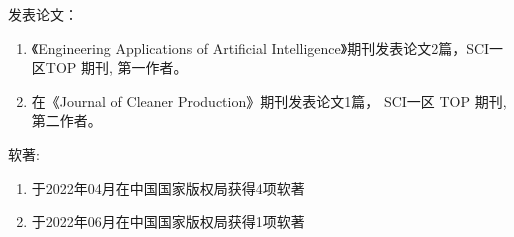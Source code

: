 \noindent 发表论文：

\begin{enumerate}[shuzi]
    \item 《Engineering Applications of Artificial Intelligence》期刊发表论文2篇，SCI一区TOP 期刊, 第一作者。
    \item 在《Journal of Cleaner Production》期刊发表论文1篇， SCI一区 TOP 期刊, 第二作者。
\end{enumerate}

\noindent 软著:

\begin{enumerate}[shuzi]
    \item 于2022年04月在中国国家版权局获得4项软著
    \item 于2022年06月在中国国家版权局获得1项软著
\end{enumerate}